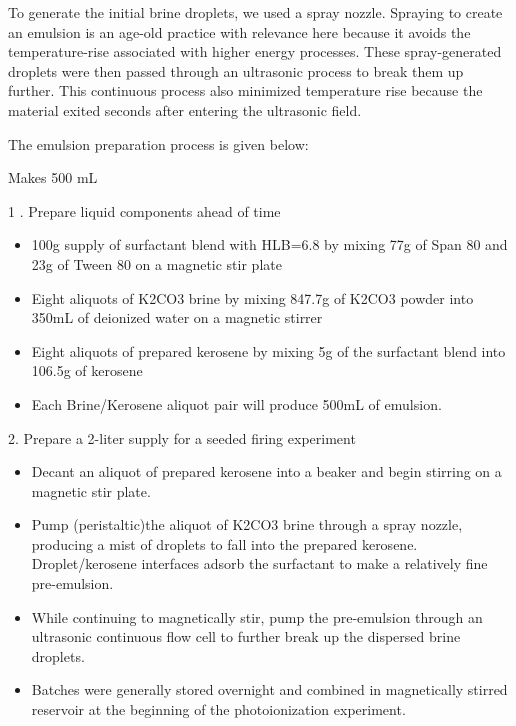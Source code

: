 To generate the initial brine droplets, we used a spray nozzle. Spraying to create an emulsion is an age-old practice \cite{atkinsonKeroseneEmulsionHow1890} with relevance here because it avoids the temperature-rise associated with higher energy processes. These spray-generated droplets were then passed through an ultrasonic process to break them up further. This continuous process also minimized temperature rise because the material exited seconds after entering the ultrasonic field. 

The emulsion preparation process is given below:

Makes 500 mL 

1 . Prepare liquid components ahead of time 
\begin{itemize}
\item 100g supply of surfactant blend with HLB=6.8 by mixing 77g of Span 80 and 23g of Tween 80 on a magnetic stir plate 

\item Eight aliquots of K2CO3 brine by mixing 847.7g of K2CO3 powder into 350mL of deionized water on a magnetic stirrer 

\item Eight aliquots of prepared kerosene by mixing 5g of the surfactant blend into 106.5g of kerosene  

\item Each Brine/Kerosene aliquot pair will produce 500mL of emulsion. 
\end{itemize}


2. Prepare a 2-liter supply for a seeded firing experiment 

\begin{itemize}
    
\item Decant an aliquot of prepared kerosene into a beaker and begin stirring on a magnetic stir plate. 

\item Pump (peristaltic)the aliquot of K2CO3 brine through a spray nozzle, producing a mist of droplets to fall into the prepared kerosene. Droplet/kerosene interfaces adsorb the surfactant to make a relatively fine pre-emulsion. 

\item While continuing to magnetically stir, pump the pre-emulsion through an ultrasonic continuous flow cell to further break up the dispersed brine droplets. 

\item Batches were generally stored overnight and combined in magnetically stirred reservoir at the beginning of the photoionization experiment. 
\end{itemize}



